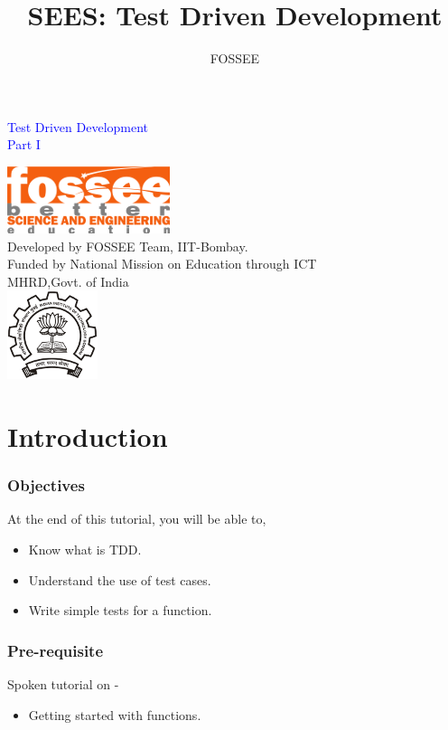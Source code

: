 \documentclass[12pt,presentation]{beamer}
\title{SEES: Test Driven Development}
\author{FOSSEE}
\begin{document}
\begin{frame}
\begin{center}
\vspace{12pt}
\textcolor{blue}{\huge Test Driven Development \\Part I}
\end{center}
\vspace{18pt}
\begin{center}
\vspace{10pt}
\includegraphics[scale=0.95]{../images/fossee-logo.png}\\
\vspace{5pt}
\scriptsize Developed by FOSSEE Team, IIT-Bombay. \\ 
\scriptsize Funded by National Mission on Education through ICT\\
\scriptsize  MHRD,Govt. of India\\
\includegraphics[scale=0.30]{../images/iitb-logo.png}\\
\end{center}
\end{frame}
\section{Introduction}

\begin{frame}
  \frametitle{Objectives}
  At the end of this tutorial, you will be able to,
  \begin{itemize}
  \item Know what is TDD.
  \item Understand the use of test cases.
  \item Write simple tests for a function.
 
  \end{itemize}
\end{frame}
\begin{frame}
\frametitle{Pre-requisite}
\label{sec-3}

Spoken tutorial on -
\begin{itemize}
\item Getting started with functions.
\end{itemize}
\end{frame}
\end{document}
